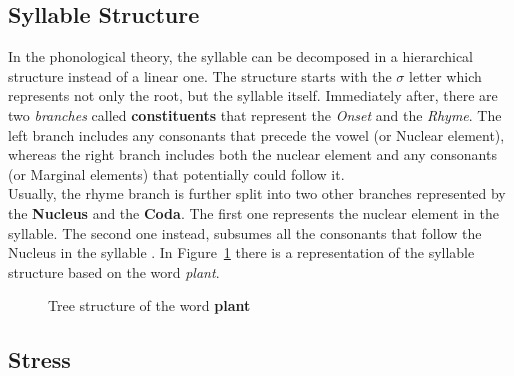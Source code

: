 \subsection{Syllable Structure}
In the phonological theory, the syllable can be decomposed in a hierarchical structure instead of a linear one. The structure starts with the $\sigma$ letter which represents not only the root, but the syllable itself. Immediately after, there are two \textit{branches} called \textbf{constituents} that represent the \textit{Onset} and the \textit{Rhyme}. The left branch includes any consonants that precede the vowel (or Nuclear element), whereas the right branch includes both the nuclear element and any consonants (or Marginal elements) that potentially could follow it. \\
\noindent Usually, the rhyme branch is further split into two other branches represented by the \textbf{Nucleus} and the \textbf{Coda}. The first one represents the nuclear element in the syllable. The second one instead, subsumes all the consonants that follow the Nucleus in the syllable \cite{syllable_site}. In Figure~\ref{fig:syllable_structure} there is a representation of the syllable structure based on the word \textit{plant}.

\begin{figure}[!ht]
    \begin{center}
    \end{center}
    \caption{Tree structure of the word \textbf{plant}\protect\footnotemark}
    \label{fig:syllable_structure}
\end{figure}


\subsection{Stress}
\label{sec:stress}

